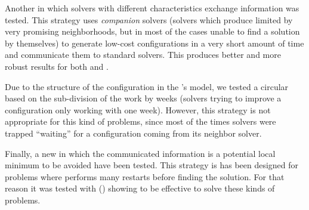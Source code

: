 Another \commstr{} in which solvers with different characteristics exchange information was tested. This strategy uses \textit{companion} solvers (solvers which produce limited by very promising neighborhoods, but in most of the cases unable to find a solution by themselves) to generate low-cost configurations in a very short amount of time and communicate them to standard solvers. This \commstr{} produces better and more robust results for both \SGP{} and \NQP{}.

Due to the structure of the configuration in the \SGP's model, we tested a circular \commstr{} based on the sub-division of the work by weeks (\ie solvers trying to improve a configuration only working with one week). However, this strategy is not appropriate for this kind of problems, since most of the times solvers were trapped ``waiting'' for a configuration coming from its neighbor solver.

Finally, a new \commstr{} in which the communicated information is a potential local minimum to be avoided have been tested. This strategy is has been designed for problems where \posl{} performs many restarts before finding the solution. For that reason it was tested with \grp{} (\GRP) showing to be effective to solve these kinds of problems.


